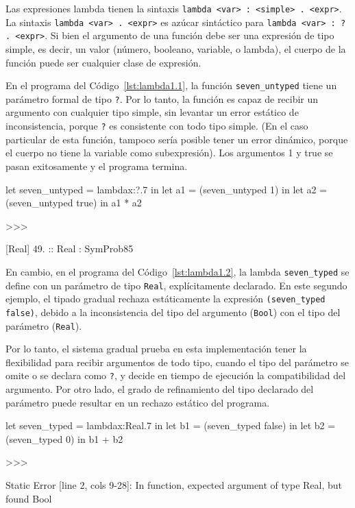 Las expresiones lambda tienen la sintaxis
\lstinline|lambda <var> : <simple> . <expr>|. La
sintaxis \lstinline|lambda <var> . <expr>| es
azúcar sintáctico para
\lstinline|lambda <var> : ? . <expr>|.  Si bien el argumento de una función
debe ser una expresión de tipo simple, es decir, un valor (número,
booleano, variable, o lambda), el cuerpo de la función puede ser
cualquier clase de expresión.

En el programa del Código~\ref{lst:lambda1.1}, la función
\lstinline|seven_untyped| tiene un parámetro formal de tipo
\lstinline|?|.  Por lo tanto, la función es capaz de recibir un
argumento con cualquier tipo simple, sin levantar un error estático de
inconsistencia, porque \lstinline|?| es consistente con todo tipo
simple. (En el caso particular de esta función, tampoco sería posible
tener un error dinámico, porque el cuerpo no tiene la variable como
subexpresión). Los argumentos 1 y true se pasan exitosamente y el
programa termina.

\begin{gplcblock}[caption={Función no tipada},label={lst:lambda1.1}]
let seven_untyped = lambdax:?.7 in
let a1 = (seven_untyped 1) in
let a2 = (seven_untyped true) in
a1 * a2 

>>>

{
	 [Real] 49. :: Real : SymProb85 
}  
\end{gplcblock}

En cambio, en el programa del Código~\ref{lst:lambda1.2}, la lambda
\lstinline|seven_typed| se define con un parámetro de tipo
\lstinline|Real|, explícitamente declarado. En este segundo ejemplo,
el tipado gradual rechaza estáticamente la expresión
\lstinline|(seven_typed false)|, debido a la inconsistencia del tipo
del argumento (\lstinline|Bool|) con el tipo del parámetro
(\lstinline|Real|).

Por lo tanto, el sistema gradual prueba en esta implementación tener
la flexibilidad para recibir argumentos de todo tipo, cuando el tipo
del parámetro se omite o se declara como \lstinline|?|, y decide en
tiempo de ejecución la compatibilidad del argumento. Por otro lado, el
grado de refinamiento del tipo declarado del parámetro puede resultar
en un rechazo estático del programa.




\begin{gplcblock}[caption={Función explícitamente tipada},label={lst:lambda1.2}]
let seven_typed = lambdax:Real.7 in
let b1 = (seven_typed false) in
let b2 = (seven_typed 0) in
b1 + b2  

>>>

Static Error [line 2, cols 9-28]: In function, expected argument of type Real, but found Bool
\end{gplcblock}


